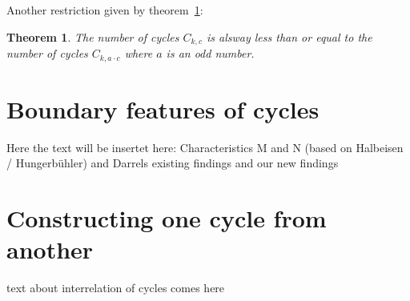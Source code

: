 \documentclass[12pt]{amsart}
\newtheorem{theorem}{Theorem}[section]
\theoremstyle{definition}
\begin{document}

\par\noindent
Another restriction given by theorem~\ref{theo:cycle_restriction_4}:

\begin{theorem}
	\label{theo:cycle_restriction_4}
	The number of cycles $C_{k,c}$ is alsway less than or equal to the number of cycles $C_{k,a\cdot c}$ where $a$ is an odd number.
\end{theorem}

\section{Boundary features of cycles}
Here the text will be insertet here: Characteristics M and N (based on Halbeisen / Hungerbühler) and Darrels existing findings and our new findings

\section{Constructing one cycle from another}
text about interrelation of cycles comes here

\vspace{1em}


\end{document}
